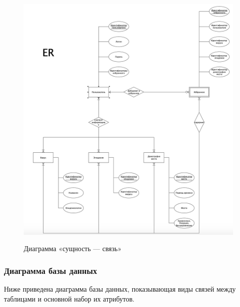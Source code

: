 \documentclass[a4paper,14pt]{extarticle}
\begin{document}
 	\begin{figure}[h!]
 		\begin{center}
 			{\includegraphics[width = \textwidth]{diagram/ER.png}}
 			\caption{
 				Диаграмма «сущность — связь»}
 			\label{ris:er}
 		\end{center}
 	\end{figure}
 	
 	\subsubsection{Диаграмма базы данных}
 	
 	Ниже приведена диаграмма базы данных, показывающая виды связей между таблицами и основной набор их атрибутов.
 	
\end{document}
